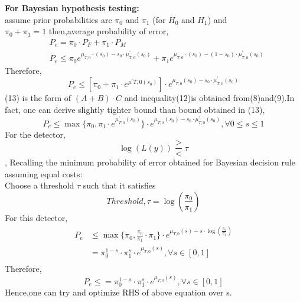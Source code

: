 \documentclass[a4paper,english,12pt]{article}
\begin{document}
\begin{exmp}\textbf{For Bayesian hypothesis testing:}\\
assume prior probabilities are $\pi_0$ and $\pi_1$ (for $H_0$ and $H_1$) and\\
 $\pi_0 + \pi_1 = 1$ then,average probability of error,
\begin{align}
&P_e=\pi_0\cdot P_F+\pi_1\cdot P_M\\
&P_e\leq\pi_0 e^{\mu_{T,0}\cdot(s_0)-s_0\cdot \mu^\prime_{T,0}(s_0)}+\pi_1 e^{\mu_{T,0}\cdot(s_0)-(1-s_0)\cdot \mu^\prime_{T,0}(s_0)}
\end{align}
Therefore,\\
\begin{equation}
P_e\leq[\pi_0+\pi_1\cdot e^{\mu^\prime{T,0}(s_0)}]\cdot e^{\mu_{T,0}(s_0)-s_0\cdot\mu^\prime_{T,0}(s_0)}
 \end{equation}
(13) is the form of $(A+B)\cdot C$ and inequality(12)is obtained from(8)and(9).In fact, one can derive slightly tighter bound than bound obtained in (13),\\
\[P_e\leq \max\{\pi_0,\pi_1\cdot e^{\mu^\prime_{T,0}(s_0)}\}\cdot e^{\mu_{T,0}(s_0)-s_0\cdot\mu^\prime_{T,0}(s_0)},\forall 0\leq s\leq 1\]
For the detector,\[\log(L(y))\frac{>}{<}\tau\],
Recalling the minimum probability of error obtained for Bayesian decision rule assuming equal costs:\\
Choose a threshold $\tau$ such that it satisfies\\
\[Threshold, \tau=\log\left(\frac{\pi_0}{\pi_1}\right)\]
For this detector,
\begin{align*}
P_e&\leq\max\{\pi_0,\frac{\pi_0}{\pi_1}\cdot \pi_1\}\cdot e^{\mu_{T,0}(s)-s\cdot \log\left(\frac{\pi_0}{\pi_1}\right)}\\
&=\pi_0^{1-s}\cdot \pi_1^s\cdot e^{\mu_{T,0}(s)},\forall s\in [0,1]\\
\end{align*}
Therefore,\\
\[P_e\leq =\pi_0^{1-s}\cdot \pi_1^s\cdot e^{\mu_{T,0}(s)},\forall s\in [0,1]\]
Hence,one can try and optimize RHS of above equation over s.
\end{exmp}
\end{document}
